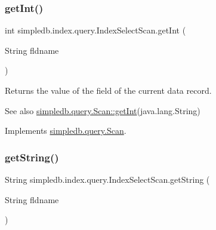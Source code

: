 \mbox{\label{classsimpledb_1_1index_1_1query_1_1IndexSelectScan_aae5a05685f70eff1c67c9d4b47b84ba8}} 
\subsubsection{\texorpdfstring{get\+Int()}{getInt()}}
{\footnotesize\ttfamily int simpledb.\+index.\+query.\+Index\+Select\+Scan.\+get\+Int (\begin{DoxyParamCaption}\item[{String}]{fldname }\end{DoxyParamCaption})\hspace{0.3cm}{\ttfamily [inline]}}

Returns the value of the field of the current data record. \begin{DoxySeeAlso}{See also}
\hyperlink{interfacesimpledb_1_1query_1_1Scan_a2e064555e16240115167b5d42d2b3d19}{simpledb.\+query.\+Scan\+::get\+Int}(java.\+lang.\+String) 
\end{DoxySeeAlso}


Implements \hyperlink{interfacesimpledb_1_1query_1_1Scan_a2e064555e16240115167b5d42d2b3d19}{simpledb.\+query.\+Scan}.

\mbox{\label{classsimpledb_1_1index_1_1query_1_1IndexSelectScan_ab67c9c8e34fa77975e00d9202075df3b}} 
\subsubsection{\texorpdfstring{get\+String()}{getString()}}
{\footnotesize\ttfamily String simpledb.\+index.\+query.\+Index\+Select\+Scan.\+get\+String (\begin{DoxyParamCaption}\item[{String}]{fldname }\end{DoxyParamCaption})\hspace{0.3cm}{\ttfamily [inline]}}

